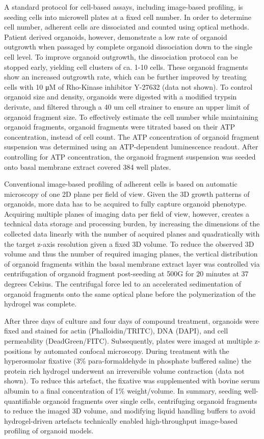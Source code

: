 \begin{flushleft}
A standard protocol for cell-based assays, including image-based profiling, is seeding cells into microwell plates at a fixed cell number. In order to determine cell number, adherent cells are dissociated and counted using optical methods. Patient derived organoids, however, demonstrate a low rate of organoid outgrowth when passaged by complete organoid dissociation down to the single cell level. To improve organoid outgrowth, the dissociation protocol can be stopped early, yielding cell clusters of ca. 1-10 cells. These organoid fragments show an increased outgrowth rate, which can be further improved by treating cells with 10 μM of Rho-Kinase inhibitor Y-27632 (data not shown). To control organoid size and density, organoids were digested with a modified trypsin derivate, and filtered through a 40 um cell strainer to ensure an upper limit of organoid fragment size. To effectively estimate the cell number while maintaining organoid fragments, organoid fragments were titrated based on their ATP concentration, instead of cell count. The ATP concentration of organoid fragment suspension was determined using an ATP-dependent luminescence readout. After controlling for ATP concentration, the organoid fragment suspension was seeded onto basal membrane extract covered 384 well plates.

Conventional image-based profiling of adherent cells is based on automatic microscopy of one 2D plane per field of view. Given the 3D growth patterns of organoids, more data has to be acquired to fully capture organoid phenotype. Acquiring multiple planes of imaging data per field of view, however, creates a technical data storage and processing burden, by increasing the dimensions of the collected data linearly with the number of acquired planes and quadratically with the target z-axis resolution given a fixed 3D volume. To reduce the observed 3D volume and thus the number of required imaging planes, the vertical distribution of organoid fragments within the basal membrane extract layer was controlled via centrifugation of organoid fragment post-seeding at 500G for 20 minutes at 37 degrees Celsius. The centrifugal force led to an accelerated sedimentation of organoid fragments onto the same optical plane before the polymerization of the hydrogel was complete.

After three days of culture and four days of compound treatment, organoids were fixed and stained for actin (Phalloidin/TRITC), DNA (DAPI), and cell permeability (DeadGreen/FITC). Subsequently, plates were imaged at multiple z-positions by automated confocal microscopy. During treatment with the hyperosmolar fixative (3\% para-formaldehyde in phosphate buffered saline) the protein rich hydrogel underwent an irreversible volume contraction (data not shown). To reduce this artefact, the fixative was supplemented with bovine serum albumin to a final concentration of 1\% weight/volume. In summary, seeding well-quantifiable organoid fragments over single cells, centrifuging organoid fragments to reduce the imaged 3D volume, and modifying liquid handling buffers to avoid hydrogel-driven artefacts technically enabled high-throughput image-based profiling of organoid models. 


\end{flushleft}
